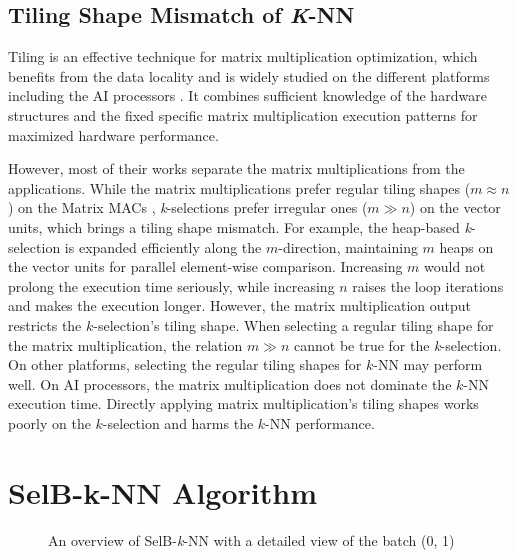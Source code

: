 \documentclass[12pt]{extbook}
\begin{document}
\subsection{Tiling Shape Mismatch of \textit{K}-NN \label{sec:tiling}}

Tiling is an effective technique for matrix multiplication optimization, which benefits from the data locality and is widely studied on the different platforms including the AI processors \cite{DBLP:conf/ppopp/Li0YJL19, DBLP:conf/ppopp/NiuLJS0022, DBLP:conf/ppopp/HongSNSS19, DBLP:conf/ipps/00020C20, DBLP:conf/ppopp/FengWCZ0D21, DBLP:conf/micro/ZhaoD20}. It combines sufficient knowledge of the hardware structures and the fixed specific matrix multiplication execution patterns for maximized hardware performance.

However, most of their works separate the matrix multiplications from the applications. While the matrix multiplications prefer regular tiling shapes ($m \approx n$) on the Matrix MACs \cite{DBLP:conf/ipps/00020C20}, \textit{k}-selections prefer irregular ones ($m \gg n$) on the vector units, which brings a tiling shape mismatch. For example, the heap-based \textit{k}-selection is expanded efficiently along the $m$-direction, maintaining $m$ heaps on the vector units for parallel element-wise comparison. Increasing $m$ would not prolong the execution time seriously, while increasing $n$ raises the loop iterations and makes the execution longer. However, the matrix multiplication output restricts the $k$-selection's tiling shape. When selecting a regular tiling shape for the matrix multiplication, the relation $m \gg n$ cannot be true for the \textit{k}-selection. On other platforms, selecting the regular tiling shapes for $k$-NN may perform well. On AI processors, the matrix multiplication does not dominate the $k$-NN execution time. Directly applying matrix multiplication's tiling shapes works poorly on the $k$-selection and harms the $k$-NN performance.


\section{SelB-k-NN Algorithm}

\begin{figure}[t]
    \caption{An overview of SelB-\textit{k}-NN with a detailed view of the batch (0, 1)}
    \label{fig:tiling}
    \end{figure}
\end{document}
